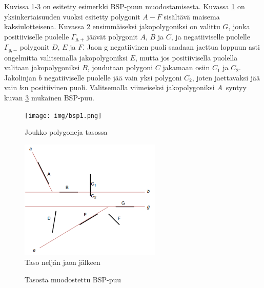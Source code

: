 \documentclass[a4paper,12pt, titlepage]{article}
\theoremstyle{break}
\begin{document}


\newpage
Kuvissa \ref{bsp1}-\ref{bsp3} on esitetty esimerkki BSP-puun muodostamisesta. Kuvassa \ref{bsp1} on yksinkertaisuuden vuoksi esitetty polygonit $A-F$ sisältävä maisema kaksiulotteisena. Kuvassa \ref{bsp2} ensimmäiseksi jakopolygoniksi on valittu $G$, jonka positiiviselle puolelle $\Gamma_{g,+}$ jäävät polygonit $A$, $B$ ja $C$, ja negatiiviselle puolelle $\Gamma_{g,-}$ polygonit $D$, $E$ ja $F$. Jaon g negatiivinen puoli saadaan jaettua loppuun asti ongelmitta valitsemalla jakopolygoniksi $E$, mutta jos positiivisella puolella valitaan jakopolygoniksi $B$, joudutaan polygoni $C$ jakamaan osiin $C_1$ ja $C_2$. Jakolinjan $b$ negatiiviselle puolelle jää vain yksi polygoni $C_2$, joten jaettavaksi jää vain $b$:n positiivinen puoli. Valitsemalla viimeiseksi jakopolygoniksi $A$ syntyy kuvan \ref{bsp3} mukainen BSP-puu.\\

\begin{figure}
 \centering
 \texttt{[image: img/bsp1.png]}
 \vspace{0.5cm}
 \caption{Joukko polygoneja tasossa}
 \label{bsp1}
\end{figure}

\begin{figure}
 \centering
 \includegraphics[width=0.6\textwidth]{img/bsp2.png}
 \vspace{0.5cm}
 \caption{Taso neljän jaon jälkeen}
 \label{bsp2}
\end{figure}

\begin{figure}
 \centering
 \caption{Tasosta muodostettu BSP-puu}
 \label{bsp3}
\end{figure}
\end{document}

